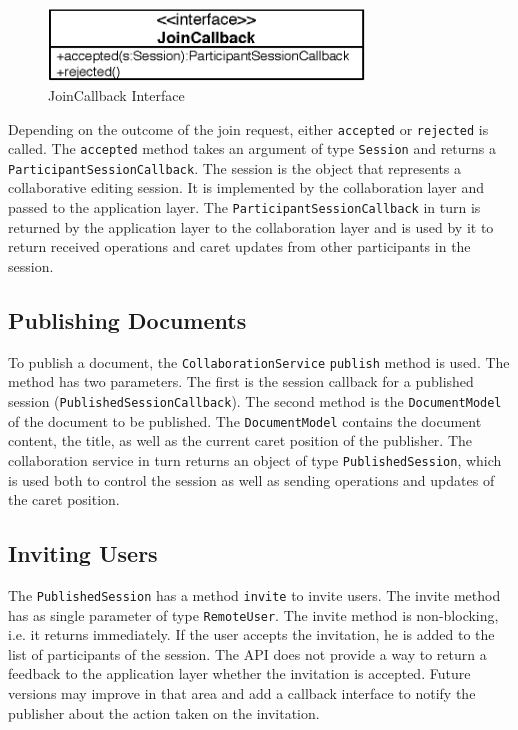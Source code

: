 \begin{figure}[H]
 \centering
 \includegraphics[width=8.43cm,height=1.94cm]{../images/finalreport/architecture_joincallback_uml.eps}
 \caption{JoinCallback Interface}
\end{figure}

Depending on the outcome of the join request, either \texttt{accepted} or
\texttt{rejected} is called. The \texttt{accepted} method takes an argument
of type \texttt{Session} and returns a \texttt{Participant\-Session\-Callback}. 
The session
is the object that represents a collaborative editing session. It is
implemented by the collaboration layer and passed to the application layer.
The \texttt{Participant\-Session\-Callback} in turn is returned by the 
application layer to the collaboration layer and is used by it to return 
received operations and caret updates from other participants in the session.


\subsection{Publishing Documents}
To publish a document, the \texttt{Collaboration\-Service} \texttt{publish}
method is used. The method has two parameters. The first is the session callback
for a published session (\texttt{Published\-Session\-Callback}). 
The second method is the \texttt{Document\-Model}
of the document to be published. The \texttt{Document\-Model} contains the
document content, the title, as well as the current caret position of the
publisher. The collaboration service in turn returns an object of type
\texttt{Published\-Session}, which is used both to control the session as well
as sending operations and updates of the caret position.


\subsection{Inviting Users}
\label{sect:archoverview.invitingusers}
The \texttt{Published\-Session} has a method \texttt{invite} to invite users.
The invite method has as single parameter of type \texttt{Remote\-User}. 
The invite method is non-blocking, i.e. it
returns immediately. If the user accepts the invitation, he is added to the
list of participants of the session. The API does not provide a way to return
a feedback to the application layer whether the invitation is accepted.
Future versions may improve in that area and add a callback interface 
to notify the publisher about the action taken on the invitation.


